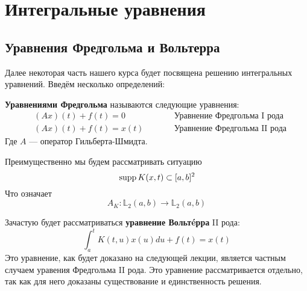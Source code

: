 \documentclass[12pt]{article}
\begin{document}
\section{Интегральные уравнения}

	\subsection{Уравнения Фредгольма и Вольтерра}

		Далее некоторая часть нашего курса будет посвящена решению интегральных уравнений. Введём несколько определений:
	
		\begin{defi}
			\textbf{Уравнениями Фредгольма} называются следующие уравнения:
			\begin{align*}
				&(Ax)(t) + f(t) = 0 &\qquad &\text{Уравнение Фредгольма I рода} \\
				&(Ax)(t) + f(t) = x(t) &\qquad &\text{Уравнение Фредгольма II рода}
			\end{align*}
			Где $A$ --- оператор Гильберта-Шмидта.
		\end{defi}
	
		Преимущественно мы будем рассматривать ситуацию 
		$$\,\text{supp}\, K(x,t) \subset [a,b]^2$$
		Что означает
		$$A_K: \mathbb{L}_2(a,b) \rightarrow \mathbb{L}_2(a,b)$$
	
		Зачастую будет рассматриваться \textbf{уравнение Вольт\'eрра} II рода:
		$$\int_a^t K(t,u) x(u) du + f(t) = x(t)$$
		Это уравнение, как будет доказано на следующей лекции, является частным случаем уравения Фредгольма 
		II рода. Это уравнение рассматривается отдельно, так как для него доказаны существование и единственность
		решения.


\end{document}
